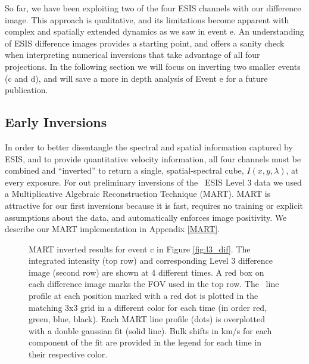     	So far, we have been exploiting two of the four ESIS channels with our difference image. This approach is qualitative,
    	and its limitations become apparent with complex and spatially extended dynamics as we saw in event e.
    	An understanding of ESIS difference images provides a starting point,
    	and offers a sanity check when interpreting numerical inversions that take advantage of all four projections.
    	In the following section we will focus on inverting two smaller events (c and d), and will save a more in depth analysis of Event e for a future publication. 
    	
    
    
    \subsection{Early Inversions} \label{sec:inversions}
    	In order to better disentangle the spectral and spatial information captured by ESIS, and to provide quantitative velocity information, all four channels must be combined and ``inverted'' to return a single, spatial-spectral cube, $I(x,y,\lambda)$, at every exposure.
    	For out preliminary inversions of the \ov \  ESIS Level 3 data we used a Multiplicative Algebraic Reconstruction Technique (MART).
    	MART is attractive for our first inversions because it is fast, requires no training or explicit assumptions about the data, and automatically enforces image  positivity.
    	We describe our MART implementation in %
    	Appendix \ref{MART}.
    	
    	\begin{figure}[htb!]
    		\centering
    		\caption{MART inverted results for event c in Figure \ref{fig:l3_dif}. The integrated intensity (top row) and corresponding Level 3 difference image (second row) are shown at 4 different times. A red box on each difference image marks the FOV used in the top row.  The \ov \ line profile at each position marked with a red dot is plotted in the matching 3x3 grid in a different color for each time (in order red, green, blue, black). Each MART line profile (dots) is overplotted with a double gaussian fit (solid line).  Bulk shifts in km/s for each component of the fit are provided in the legend for each time in their respective color. }
    		\label{fig:perfect_x_inverted}
    	\end{figure}
        
